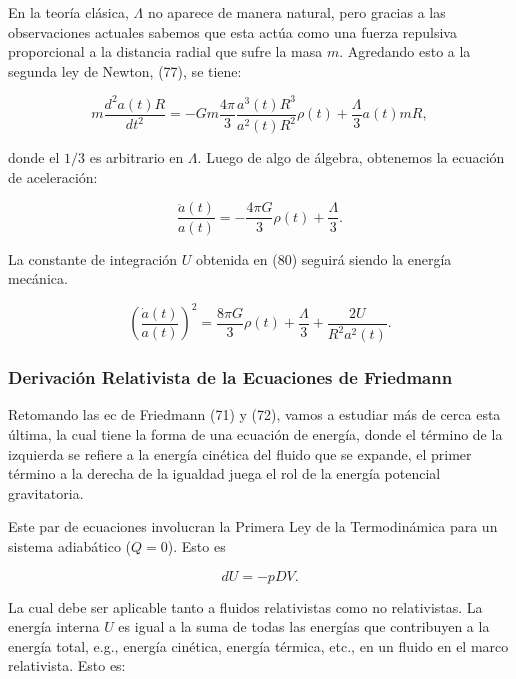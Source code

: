\documentclass{article}
\begin{document}
    En la teoría clásica, $\Lambda$ no aparece de manera natural, pero gracias a las observaciones actuales sabemos que esta actúa como una fuerza repulsiva proporcional a la distancia radial que sufre la masa $m$. Agredando esto a la segunda ley de Newton, (77), se tiene: 
    
    \begin{equation}
        m \frac{d^2 a(t)R}{dt^2} = -Gm \frac{4\pi}{3}\frac{a^3(t)R^3}{a^2(t)R^2}\rho(t) + \frac{\Lambda}{3} a(t) mR,
    \end{equation}
    
    donde el $1/3$ es arbitrario en $\Lambda$. Luego de algo de álgebra, obtenemos la ecuación de aceleración: 
    
    \begin{equation}
        \boxed{\frac{\ddot{a}(t)}{a(t)} = - \frac{4\pi G}{3}  \rho(t) + \frac{\Lambda}{3}.} 
    \end{equation}
    
    La constante de integración $U$ obtenida en (80) seguirá siendo la energía mecánica. 
    
    \begin{equation}
        \boxed{\left(\frac{\dot{a}(t)}{a(t)} \right)^2 = \frac{8\pi G}{3} \rho(t) + \frac{\Lambda}{3} +  \frac{2U}{R^2 a^2(t)}.}
    \end{equation}
    
    \subsubsection{Derivación Relativista de la Ecuaciones de Friedmann}
    
    Retomando las ec de Friedmann (71) y (72), vamos a estudiar más de cerca esta última, la cual tiene la forma de una ecuación de energía, donde el término de la izquierda se refiere a la energía cinética del fluido que se expande, el primer término a la derecha de la igualdad juega el rol de la energía potencial gravitatoria.
    
    
    Este par de ecuaciones involucran la Primera Ley de la Termodinámica  para un sistema adiabático ($Q=0$). Esto es
    
    \begin{equation}
        dU = -p DV.
    \end{equation}
    
  La cual debe ser aplicable tanto a fluidos relativistas como no relativistas. La energía interna $U$ es igual a la suma de todas las energías que contribuyen a la energía total, e.g., energía cinética, energía térmica, etc., en un fluido en el marco relativista. Esto es:
  
\end{document}

